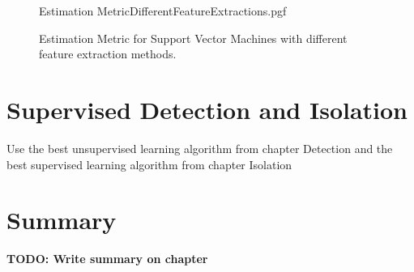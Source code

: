 \begin{figure}[!htb]
	\centering
	{Estimation MetricDifferentFeatureExtractions.pgf}
	
	\caption{Estimation Metric for Support Vector Machines with different feature extraction methods.}
	\label{fig:SVMCompareFeatureExtractions}
\end{figure}

\section{Supervised Detection and Isolation}
Use the best unsupervised learning algorithm from chapter Detection and the best supervised learning algorithm from chapter Isolation

\section{Summary}
\textbf{TODO: Write summary on chapter}